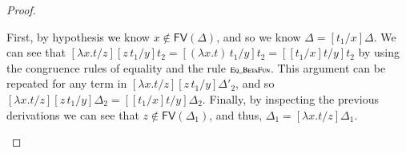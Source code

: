 \documentclass{elsarticle}
\newcommand{\FILLnt}[1]{\mathit{#1}}
\newcommand{\FILLmv}[1]{\mathit{#1}}
\newcommand{\FILLsym}[1]{#1}
\newcommand{\FILLdrulename}[1]{\textsc{#1}}
\renewcommand{\FILLdrulename}[1]{\scriptsize \textsc{#1}}
\begin{document}
\begin{proof}
\begin{report}
\begin{itemize}
First, by hypothesis we know $ \FILLmv{x}  \not\in \mathsf{FV}(  \Delta  ) $, and so we know $\Delta  \FILLsym{=}  \FILLsym{[}  \FILLnt{t_{{\mathrm{1}}}}  \FILLsym{/}  \FILLmv{x}  \FILLsym{]}  \Delta$.  We can see
that $\FILLsym{[}   \lambda  \FILLmv{x}  .  \FILLnt{t}   \FILLsym{/}  \FILLmv{z}  \FILLsym{]}  \FILLsym{[}  \FILLmv{z} \, \FILLnt{t_{{\mathrm{1}}}}  \FILLsym{/}  \FILLmv{y}  \FILLsym{]}  \FILLnt{t_{{\mathrm{2}}}}  \FILLsym{=}  \FILLsym{[}   (  \lambda  \FILLmv{x}  .  \FILLnt{t}  )  \, \FILLnt{t_{{\mathrm{1}}}}  \FILLsym{/}  \FILLmv{y}  \FILLsym{]}  \FILLnt{t_{{\mathrm{2}}}} = \FILLsym{[}  \FILLsym{[}  \FILLnt{t_{{\mathrm{1}}}}  \FILLsym{/}  \FILLmv{x}  \FILLsym{]}  \FILLnt{t}  \FILLsym{/}  \FILLmv{y}  \FILLsym{]}  \FILLnt{t_{{\mathrm{2}}}}$ by using the congruence rules
of equality and the rule $\FILLdrulename{Eq\_BetaFun}$.  This argument can be repeated for any term
in $\FILLsym{[}   \lambda  \FILLmv{x}  .  \FILLnt{t}   \FILLsym{/}  \FILLmv{z}  \FILLsym{]}  \FILLsym{[}  \FILLmv{z} \, \FILLnt{t_{{\mathrm{1}}}}  \FILLsym{/}  \FILLmv{y}  \FILLsym{]}  \Delta'_{{\mathrm{2}}}$, and so $\FILLsym{[}   \lambda  \FILLmv{x}  .  \FILLnt{t}   \FILLsym{/}  \FILLmv{z}  \FILLsym{]}  \FILLsym{[}  \FILLmv{z} \, \FILLnt{t_{{\mathrm{1}}}}  \FILLsym{/}  \FILLmv{y}  \FILLsym{]}  \Delta_{{\mathrm{2}}}  \FILLsym{=}  \FILLsym{[}  \FILLsym{[}  \FILLnt{t_{{\mathrm{1}}}}  \FILLsym{/}  \FILLmv{x}  \FILLsym{]}  \FILLnt{t}  \FILLsym{/}  \FILLmv{y}  \FILLsym{]}  \Delta_{{\mathrm{2}}}$.  Finally, by inspecting the previous
derivations we can see that $ \FILLmv{z}  \not\in \mathsf{FV}(  \Delta_{{\mathrm{1}}}  ) $, and thus, $\Delta_{{\mathrm{1}}}  \FILLsym{=}  \FILLsym{[}   \lambda  \FILLmv{x}  .  \FILLnt{t}   \FILLsym{/}  \FILLmv{z}  \FILLsym{]}  \Delta_{{\mathrm{1}}}$.  


\end{itemize}
\end{report}
\end{proof}
\end{document}
